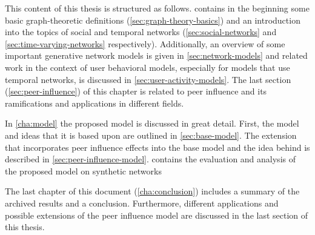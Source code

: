 This content of this thesis is structured as follows.
 contains in the beginning some basic graph-theoretic definitions (\cref{sec:graph-theory-basics}) and an introduction into the topics of social and temporal networks (\cref{sec:social-networks} and \cref{sec:time-varying-networks} respectively).
Additionally, an overview of some important generative network models is given in \cref{sec:network-models} and related work in the context of user behavioral models, especially for models that use temporal networks, is discussed in \cref{sec:user-activity-models}.
The last section (\cref{sec:peer-influence}) of this chapter is related to peer influence and its ramifications and applications in different fields.

In \cref{cha:model} the proposed model is discussed in great detail.
First, the model and ideas that it is based upon are outlined in \cref{sec:base-model}.
The extension that incorporates peer influence effects into the base model and the idea behind is described in \cref{sec:peer-influence-model}.
 contains the evaluation and analysis of the proposed model on synthetic networks

The last chapter of this document (\cref{cha:conclusion}) includes a summary of the archived results and a conclusion.
Furthermore, different applications and possible extensions of the peer influence model are discussed in the last section of this thesis.
